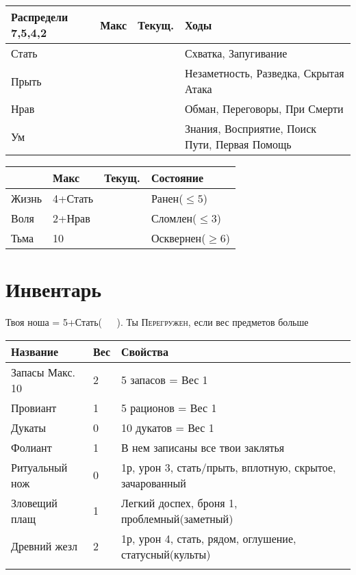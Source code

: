 \documentclass[10pt,twoside]{report}
\begin{document}
\begin{center}
\begin{tabular}{|p{2cm}|p{1cm}|p{1cm}|p{3cm}|}
\hline
  Распредели 7,5,4,2 & Макс & Текущ. & Ходы \\ \hline
  Стать & & & {\footnotesize Схватка, Запугивание}\\ [5ex] \hline
  Прыть & & & {\footnotesize Незаметность, Разведка, Скрытая Атака}\\ \hline
  Нрав & & & {\footnotesize Обман, Переговоры, При Смерти}\\ [5ex] \hline
  Ум & & & {\footnotesize Знания, Восприятие, Поиск Пути, Первая Помощь} \\ \hline
\end{tabular}

\begin{tabular}{|p{1.5cm}|p{1.5cm}|p{1cm}|p{3cm}|}
  \hline
   & Макс & Текущ. & Состояние \\ \hline
  Жизнь & 4+Стать & & Ранен($\leq 5$) \\ \hline
  Воля & 2+Нрав & & Сломлен($\leq 3$) \\ \hline
  Тьма & 10  & &  Осквернен($\geq 6$) \\ \hline
\end{tabular}

\end{center}

\pagebreak
\section*{Инвентарь}

Твоя ноша = 5+Стать(\verb!   !). Ты {\scshape Перегружен}, если вес
предметов больше
\begin{center}
  {\footnotesize
\begin{tabular}{|p{2cm}|p{0.5cm}|p{4.5cm}|}
  \hline
  Название & Вес & Свойства \\ \hline
  Запасы {\tiny Макс. 10} & 2 & 5 запасов = Вес 1 \\
  Провиант & 1 & 5 рационов = Вес 1 \\
  Дукаты & 0 & 10 дукатов = Вес 1 \\ \hline
  Фолиант & 1 & В нем записаны все твои заклятья \\
  Ритуальный нож & 0 & 1р, урон 3, стать/прыть, вплотную, скрытое, зачарованный \\
  Зловещий плащ & 1 & Легкий доспех, броня 1, проблемный(заметный) \\
  Древний жезл & 2 & 1р, урон 4, стать, рядом, оглушение, статусный(культы) \\
   & & \\ [45ex]
   \hline  
\end{tabular}
}
\end{center}
\pagebreak
\end{document}
